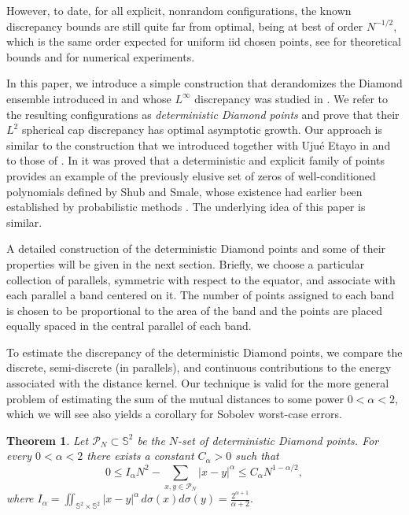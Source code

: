 \documentclass[11pt]{amsart}
\newtheorem{theorem}{Theorem}
\newcommand{\Sph}{\mathbb S^2}
\newcommand{\cP}{\mathcal P}
\begin{document}
However, to date, for all explicit, nonrandom configurations, the known discrepancy bounds are still quite far from optimal, being at best of order $N^{-1/2}$, which is the same order expected for uniform iid chosen points,
see \cite{ABD12,Eta21,FHM23} for theoretical bounds and \cite{HMS} for numerical experiments.


In this paper, we introduce a simple construction that derandomizes the Diamond ensemble introduced in \cite{Diamond} and whose $L^\infty$ discrepancy was studied in \cite{Eta21}. We refer to the resulting configurations as {\em deterministic Diamond points} and prove that their $L^2$ spherical cap discrepancy has optimal asymptotic growth. Our approach is similar to the construction that we introduced together with Uju\'e Etayo in \cite{BEMOC21} and to those of \cite{BL22,LG26}.
In \cite{BEMOC21}
it was proved that a deterministic and explicit family of points provides an example of the previously elusive set of zeros
of well-conditioned polynomials defined
by Shub and Smale, whose existence
had earlier been established by probabilistic methods \cite{SS93}. The underlying idea of this paper is similar.

A detailed construction of the deterministic Diamond points and some of their properties will be given in the next section. Briefly, we choose
a particular collection of parallels, symmetric with respect to the equator, and associate with each
parallel a band centered on it. The number of points assigned to each band
is chosen to be proportional to the area of the band and the points are placed equally spaced in the central parallel of each band.

To estimate the discrepancy of the deterministic Diamond points, we compare the discrete, semi-discrete (in parallels), and continuous contributions to
the energy
associated with the distance kernel. Our technique is valid for the more general problem of estimating the sum of the mutual distances to some power $0<\alpha<2$, which we will see also yields a corollary for Sobolev worst-case errors.




\begin{theorem}\label{thm:main}
Let $\cP_N\subset\mathbb S^2$ be the $N$-set of deterministic Diamond points.  For every $0<\alpha<2$ there exists a constant $C_\alpha>0$ such that
\begin{equation}\label{theo:ineq}
0\leq  I_\alpha N^2-\sum_{x,y\in\cP_N}|x-y|^\alpha
   \le C_\alpha N^{1-\alpha/2},
\end{equation}
where $I_\alpha=\iint_{\Sph\times\Sph}|x-y|^\alpha
 \,d\sigma(x)d\sigma(y)=\frac{2^{\alpha+1}}{\alpha+2}.$
\end{theorem}
\end{document}
